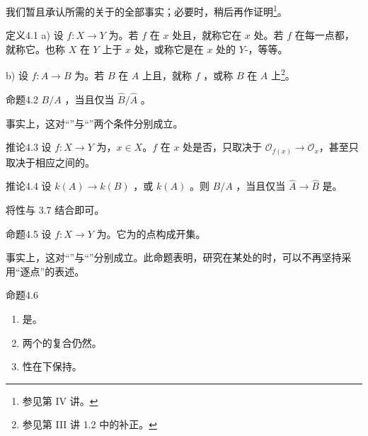 我们暂且承认所需的关于的全部事实；必要时，稍后再作证明\footnote{参见第 IV 讲。}。
\begin{SGAresult}{定义}{4.1}
a) 设 $f\colon X\to Y$ 为。若 $f$ 在 $x$ 处且，就称它在 $x$ 处。若 $f$ 在每一点都，就称它。也称 $X$ 在 $Y$ 上于 $x$ 处，或称它是在 $x$ 处的 $Y$-，等等。

b) 设 $f\colon A\to B$ 为。若 $B$ 在 $A$ 上且，就称 $f$ ，或称 $B$ 在 $A$ 上\footnote{参见第 III 讲 1.2 中的补正。}。
\end{SGAresult}
\begin{SGAresult}{命题}{4.2}
$B/A$ ，当且仅当 $\widehat B/\widehat A$ 。
\end{SGAresult}
事实上，这对“”与“”两个条件分别成立。
\begin{SGAresult}{推论}{4.3}
设 $f\colon X\to Y$ 为，$x\in X$。$f$ 在 $x$ 处是否，只取决于 $\mathcal O_{f(x)}\to\mathcal O_x$，甚至只取决于相应之间的。
\end{SGAresult}
\begin{SGAresult}{推论}{4.4}
设 $k(A)\to k(B)$ ，或 $k(A)$ 。则 $B/A$ ，当且仅当 $\widehat A\to\widehat B$ 是。
\end{SGAresult}
将性与 3.7 结合即可。
\begin{SGAresult}{命题}{4.5}
设 $f\colon X\to Y$ 为。它为的点构成开集。
\end{SGAresult}
事实上，这对“”与“”分别成立。此命题表明，研究在某处的时，可以不再坚持采用“逐点”的表述。
\begin{SGAresult}{命题}{4.6}
\begin{enumerate}
\item[(i)] 是。
\item[(ii)] 两个的复合仍然。
\item[(iii)] 性在下保持。
\end{enumerate}
\end{SGAresult}
